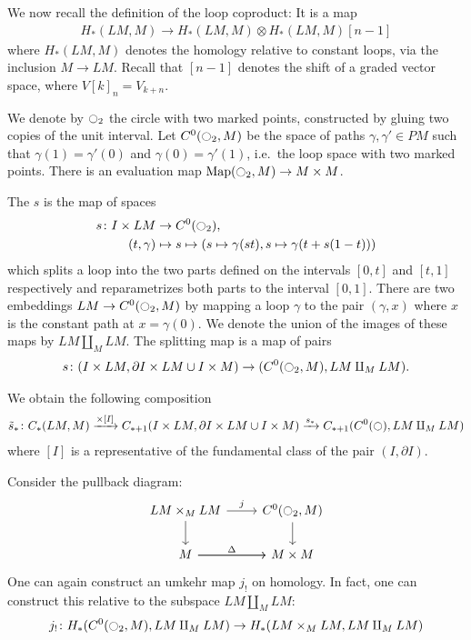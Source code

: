 \documentclass{scrartcl}
\let\emph\relax
\theoremstyle{plain}
\theoremstyle{definition}
\newcommand{\union}{\mathbin{\cup}}
\let\xto\xrightarrow
\DeclareMathOperator{\Map}{Map}
\renewcommand{\coprod}{\mathbin{\amalg}}
\begin{document}
We now recall the definition of the loop coproduct: It is a map
\begin{align*}
    H_*(LM, M) \to H_*(LM, M)\otimes H_{*}(LM, M)[n-1]
\end{align*}
where $H_*(LM, M)$ denotes the homology relative to constant loops, via the inclusion $M\to LM$. Recall that $[n-1]$ denotes the shift of a graded vector space, where $V[k]_n = V_{k+n}$.

We denote by $\ocircle_2$ the circle with two marked points, constructed by gluing two copies of the unit interval. Let $C^0(\ocircle_2, M)$ be the space of paths $\gamma, \gamma'\in PM$ such that $\gamma(1) = \gamma'(0)$ and $\gamma(0) = \gamma'(1)$, i.e.\ the loop space with two marked points. There is an evaluation map $\Map(\ocircle_2, M)\to M\times M$.

The \emph{splitting map} $s$ is the map of spaces 
\begin{align*}
    s\colon I\times LM & \to C^0(\ocircle_2),\\
    (t, \gamma) &\mapsto s\mapsto (s\mapsto \gamma(st), s\mapsto \gamma(t + s(1-t)))
\end{align*}
which splits a loop into the two parts defined on the intervals $[0, t]$ and $[t, 1]$ respectively and reparametrizes both parts to the interval $[0, 1]$. There are two embeddings $LM\to  C^0(\ocircle_2, M)$ by mapping a loop $\gamma$ to the pair $(\gamma, x)$ where $x$ is the constant path at $x=\gamma(0)$. We denote the union of the images of these maps by $LM\coprod_M LM$. The splitting map is a map of pairs
\begin{align*}
    s\colon (I\times LM, \partial I\times LM \union I\times M) \to ( C^0(\ocircle_2, M), LM\coprod_M LM).
\end{align*} 

We obtain the following composition
\begin{align*}
    \tilde s_*\colon C_*(LM, M) \xto{\times [I]} C_{*+1}(I\times LM, \partial I\times LM\union I\times M) \xto{s_*} C_{*+1}( C^0(\ocircle), LM\coprod_M LM)
\end{align*}
where $[I]$ is a representative of the fundamental class of the pair $(I, \partial I)$.

Consider the pullback diagram:
\[\begin{tikzcd}
    LM\times_M LM \dar \rar["j"] &   C^0(\ocircle_2, M) \dar \\
    M \rar["\Delta"] \rar & M\times M
\end{tikzcd}\]
One can again construct an umkehr map $j_!$ on homology. In fact, one can construct this relative to the subspace $LM\coprod_M LM$:
$$ j_!\colon H_*( C^0(\ocircle_2, M), LM\coprod_M LM) \to H_*(LM\times_M LM, LM\coprod_M LM)$$
\end{document}
